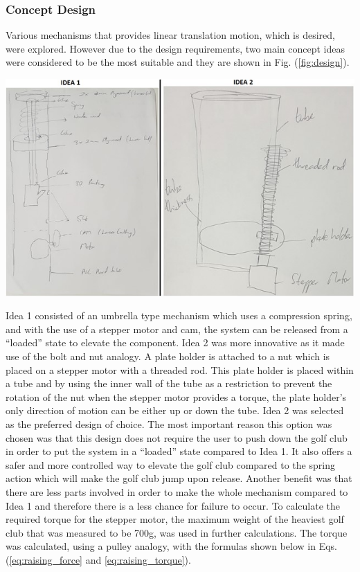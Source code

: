 \documentclass[11pt,landscape]{article}
\newenvironment{Figure}
  {\par\medskip\noindent\minipage{\linewidth}}
  {\endminipage\par\medskip}
\begin{document}
\begin{multicols}{2}
    \subsubsection{Concept Design}
    Various mechanisms that provides linear translation motion, which is
    desired, were explored. However due to the design requirements, two main
    concept ideas were considered to be the most suitable and they are shown in
    Fig. (\ref{fig:design}).
    
    \begin{Figure}
        \begin{center}
            \includegraphics[width=\textwidth]{Figure19.jpg}
            \label{fig:design}
        \end{center}
    \end{Figure}
    
    
    Idea 1 consisted of an umbrella type mechanism which uses a compression
    spring, and with the use of a stepper motor and cam, the system can be
    released from a “loaded” state to elevate the component. Idea 2 was more
    innovative as it made use of the bolt and nut analogy. A plate holder is
    attached to a nut which is placed on a stepper motor with a threaded rod.
    This plate holder is placed within a tube and by using the inner wall of the
    tube as a restriction to prevent the rotation of the nut when the stepper
    motor provides a torque, the plate holder’s only direction of motion can be
    either up or down the tube. Idea 2 was selected as the preferred design of
    choice. The most important reason this option was chosen was that this
    design does not require the user to push down the golf club in order to put
    the system in a “loaded” state compared to Idea 1. It also offers a safer
    and more controlled way to elevate the golf club compared to the spring
    action which will make the golf club jump upon release. Another benefit was
    that there are less parts involved in order to make the whole mechanism
    compared to Idea 1 and therefore there is a less chance for failure to
    occur. To calculate the required torque for the stepper motor, the maximum
    weight of the heaviest golf club that was measured to be 700g, was used in further
    calculations. The torque was calculated, using a pulley analogy, with the
    formulas shown below in Eqs.(\ref{eq:raising_force} and \ref{eq:raising_torque}).
    

\end{multicols}
\end{document}
